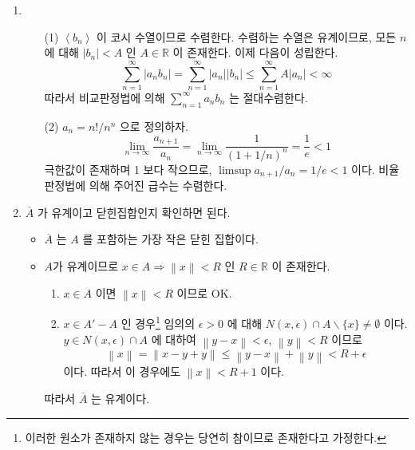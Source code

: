 \documentclass[12pt]{report}
\newcommand{\numl}[1]{\item[\large\textbf{\sffamily #1.}]}
\newcommand{\norm}[1]{\left\lVert#1\right\rVert}
\renewcommand{\span}[1]{\left\langle #1 \right\rangle}
\newcommand{\ra}{\rightarrow}
\newcommand{\Ra}{\Rightarrow}
\newcommand{\abs}[1]{\left|#1\right|}
\newcommand{\bs}{\backslash}
\newcommand{\R}{\mathbb{R}}
\begin{document}
\begin{enumerate}
\numl{3}
\begin{enumerate}
	\item[(1)] $\span{b_n}$ 이 코시 수열이므로 수렴한다. 수렴하는 수열은 유계이므로, 모든 $n$ 에 대해 $\abs{b_n} < A$ 인 $A\in\R$ 이 존재한다. 이제 다음이 성립한다.
	$$\sum_{n=1}^\infty \abs{a_nb_n} = \sum_{n=1}^\infty \abs{a_n}\abs{b_n}\leq \sum_{n=1}^\infty A\abs{a_n} < \infty$$
	따라서 비교판정법에 의해 $\sum_{n=1}^\infty a_nb_n$ 는 절대수렴한다.
	\item[(2)] $a_n = n!/n^n$ 으로 정의하자.
	$$\lim_{n\ra\infty} \frac{a_{n+1}}{a_n} = \lim_{n\ra\infty} \frac{1}{(1+1/n)^n} = \frac{1}{e} < 1$$
	극한값이 존재하며 1 보다 작으므로, $\limsup a_{n+1}/a_n = 1/e < 1$ 이다. 비율판정법에 의해 주어진 급수는 수렴한다.
\end{enumerate}

\numl{4} $\overline{A}$ 가 유계이고 닫힌집합인지 확인하면 된다.
\begin{itemize}
	\item $\overline{A}$ 는 $A$ 를 포함하는 가장 작은 닫힌 집합이다.
	\item $A$가 유계이므로 $x\in A \Ra \norm{x}<R$ 인 $R\in\R$ 이 존재한다.
	\begin{enumerate}
		\item $x\in A$ 이면 $\norm{x}<R$ 이므로 OK.
		\item $x\in A' - A$ 인 경우\footnote{이러한 원소가 존재하지 않는 경우는 당연히 참이므로 존재한다고 가정한다.} 임의의 $\epsilon > 0$ 에 대해 $N(x, \epsilon) \cap A\bs \{x\} \neq \emptyset$ 이다. $y\in N(x, \epsilon) \cap A$ 에 대하여 $\norm{y-x} < \epsilon$, $\norm{y}<R$ 이므로
		$$\norm{x} = \norm{x-y+y} \leq \norm{y-x}+\norm{y} <R + \epsilon$$
		이다. 따라서 이 경우에도 $\norm{x} < R + 1$ 이다.
	\end{enumerate}
	따라서 $\overline{A}$ 는 유계이다.
\end{itemize}


\end{enumerate}
\end{document}
